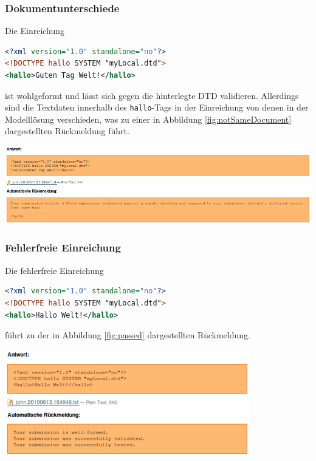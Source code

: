 \documentclass[a4paper]{scrartcl}
\begin{document}
      \subsubsection{Dokumentunterschiede}
      Die Einreichung
  	  \begin{lstlisting}[language=XML, captionpos=b, frame=tlRB, caption={Beispiel für eine semantisch falsche XML-Datei.}]
<?xml version="1.0" standalone="no"?>
<!DOCTYPE hallo SYSTEM "myLocal.dtd">
<hallo>Guten Tag Welt!</hallo>
\end{lstlisting}
      ist wohlgeformt und lässt sich gegen die hinterlegte DTD validieren. Allerdings sind die Textdaten innerhalb des \texttt{hallo}-Tags in der Einreichung von denen in der Modelllösung verschieden, was zu einer in Abbildung \ref{fig:notSameDocument} dargestellten Rückmeldung führt.
  	  \begin{center}
        \captionsetup{type=figure}
	      \includegraphics[width=1\textwidth]{images/notSameDocument.png}
	      \label{fig:notSameDocument}
      \end{center}
  	  
  	  \subsubsection{Fehlerfreie Einreichung}
  	  Die fehlerfreie Einreichung
  	  \begin{lstlisting}[language=XML, captionpos=b, frame=tlRB, caption={Fehlerfreie Einreichung}]
<?xml version="1.0" standalone="no"?>
<!DOCTYPE hallo SYSTEM "myLocal.dtd">
<hallo>Hallo Welt!</hallo>
\end{lstlisting}
  	  führt zu der in Abbildung \ref{fig:passed} dargestellten Rückmeldung.
  	  \begin{center}
        \captionsetup{type=figure}
	      \includegraphics[width=0.8\textwidth]{images/passed.png}
	      \label{fig:passed}
      \end{center}
\end{document}
